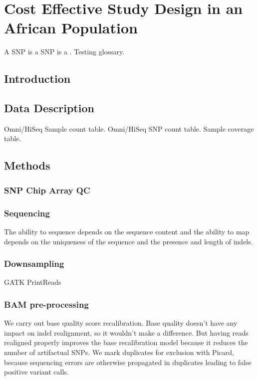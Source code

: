 
\chapter{Cost Effective Study Design in an African Population}
\ifpdf
    \graphicspath{{Chapter1/Chapter1Figs/PNG/}{Chapter1/Chapter1Figs/PDF/}{Chapter1/Chapter1Figs/}}
\else
    \graphicspath{{Chapter1/Chapter1Figs/EPS/}{Chapter1/Chapter1Figs/}}
\fi

A \gls{SNP} is a \Gls{SNP} is a . Testing glossary.

\section{Introduction}
\section{Data Description}
Omni/HiSeq Sample count table. Omni/HiSeq SNP count table. Sample coverage table.
\section{Methods}
\subsection{SNP Chip Array QC}
\subsection{Sequencing}
The ability to sequence depends on the sequence content and the ability to map depends on the uniqueness of the sequence and the presence and length of indels.
\subsection{Downsampling}
GATK PrintReads\cite{DePristo2011}
\subsection{BAM pre-processing}
We carry out base quality score recalibration. Base quality doesn't have any impact on indel realignment, so it wouldn't make a difference. But having reads realigned properly improves the base recalibration model because it reduces the number of artifactual SNPs.
We mark duplicates for exclusion with Picard, because sequencing errors are otherwise propagated in duplicates leading to false positive variant calls.
